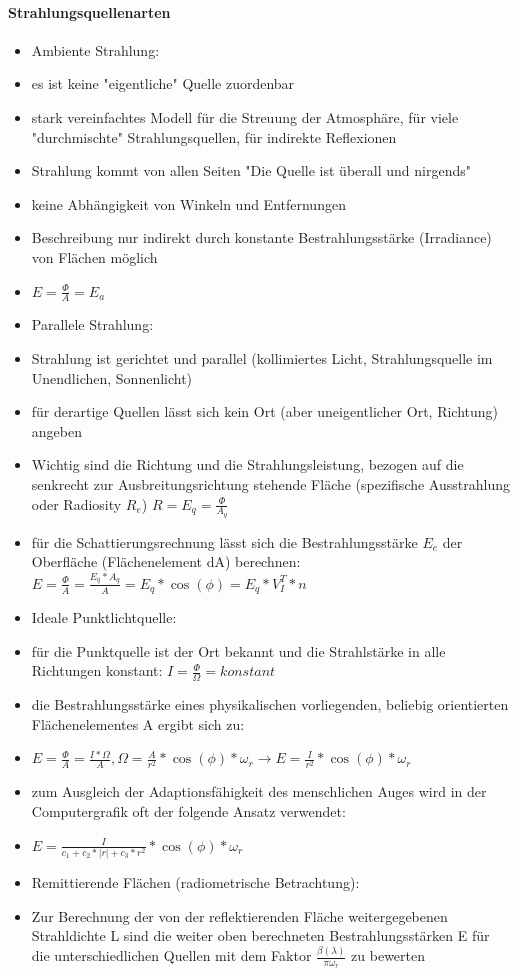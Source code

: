 \documentclass[10pt,landscape]{article}
\begin{document}
\begin{multicols}{3}
\paragraph{Strahlungsquellenarten}
\begin{itemize}
  \item Ambiente Strahlung:
  \item es ist keine "eigentliche" Quelle zuordenbar
  \item stark vereinfachtes Modell für die Streuung der Atmosphäre, für viele "durchmischte" Strahlungsquellen, für indirekte Reflexionen
  \item Strahlung kommt von allen Seiten "Die Quelle ist überall und nirgends"
  \item keine Abhängigkeit von Winkeln und Entfernungen
  \item Beschreibung nur indirekt durch konstante Bestrahlungsstärke (Irradiance) von Flächen möglich
  \item $E=\frac{\Phi}{A}=E_a$
  \item Parallele Strahlung:
  \item Strahlung ist gerichtet und parallel (kollimiertes Licht, Strahlungsquelle im Unendlichen, Sonnenlicht)
  \item für derartige Quellen lässt sich kein Ort (aber uneigentlicher Ort, Richtung) angeben
  \item Wichtig sind die Richtung und die Strahlungsleistung, bezogen auf die senkrecht zur Ausbreitungsrichtung stehende Fläche (spezifische Ausstrahlung oder Radiosity $R_e$) $R=E_q=\frac{\Phi}{A_q}$
  \item für die Schattierungsrechnung lässt sich die Bestrahlungsstärke $E_e$ der Oberfläche (Flächenelement dA) berechnen: $E=\frac{\Phi}{A}=\frac{E_q*A_q}{A}=E_q*\cos(\phi) = E_q*V_I^T*n$
  \item Ideale Punktlichtquelle:
  \item für die Punktquelle ist der Ort bekannt und die Strahlstärke in alle Richtungen konstant: $I=\frac{\Phi}{\Omega}=konstant$
  \item die Bestrahlungsstärke eines physikalischen vorliegenden, beliebig orientierten Flächenelementes A ergibt sich zu:
  \item $E=\frac{\Phi}{A}=\frac{I*\Omega}{A}, \Omega=\frac{A}{r^2}*\cos(\phi)*\omega_r \rightarrow E=\frac{I}{r^2}*\cos(\phi)*\omega_r$
  \item zum Ausgleich der Adaptionsfähigkeit des menschlichen Auges wird in der Computergrafik oft der folgende Ansatz verwendet:
  \item $E=\frac{I}{c_1+c_2*|r|+c_3*r^2}*\cos(\phi)*\omega_r$
  \item Remittierende Flächen (radiometrische Betrachtung):
  \item Zur Berechnung der von der reflektierenden Fläche weitergegebenen Strahldichte L sind die weiter oben berechneten Bestrahlungsstärken E für die unterschiedlichen Quellen mit dem Faktor $\frac{\beta(\lambda)}{\pi\omega_r}$ zu bewerten
\end{itemize}


\end{multicols}
\end{document}
